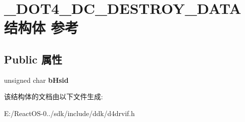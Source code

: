 \hypertarget{struct___d_o_t4___d_c___d_e_s_t_r_o_y___d_a_t_a}{}\section{\+\_\+\+D\+O\+T4\+\_\+\+D\+C\+\_\+\+D\+E\+S\+T\+R\+O\+Y\+\_\+\+D\+A\+T\+A结构体 参考}
\label{struct___d_o_t4___d_c___d_e_s_t_r_o_y___d_a_t_a}
\subsection*{Public 属性}
\begin{DoxyCompactItemize}
\item 
\mbox{\label{struct___d_o_t4___d_c___d_e_s_t_r_o_y___d_a_t_a_a9b5f5615faab46992b44995543cbfe28}} 
unsigned char {\bfseries b\+Hsid}
\end{DoxyCompactItemize}


该结构体的文档由以下文件生成\+:\begin{DoxyCompactItemize}
\item 
E\+:/\+React\+O\+S-\/0../sdk/include/ddk/d4drvif.\+h\end{DoxyCompactItemize}
